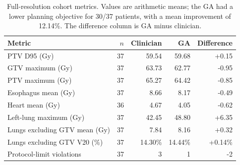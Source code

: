 \begin{table}[t]
\centering
\caption{Full-resolution cohort metrics. Values are arithmetic means; the GA had a lower planning objective for 30/37 patients, with a mean improvement of 12.14\%. The difference column is GA minus clinician.}
\label{tab:cohort-results}
\small
\begin{tabular}{lrrrr}
\toprule
Metric & $n$ & Clinician & GA & Difference \\
\midrule
PTV D95 (Gy) & 37 & 59.54 & 59.68 & +0.15 \\
GTV maximum (Gy) & 37 & 63.73 & 62.77 & -0.95 \\
PTV maximum (Gy) & 37 & 65.27 & 64.42 & -0.85 \\
Esophagus mean (Gy) & 37 & 8.66 & 8.17 & -0.49 \\
Heart mean (Gy) & 36 & 4.67 & 4.05 & -0.62 \\
Left-lung maximum (Gy) & 37 & 42.45 & 48.80 & +6.35 \\
Lungs excluding GTV mean (Gy) & 37 & 7.84 & 8.16 & +0.32 \\
Lungs excluding GTV V20 (\%) & 37 & 14.30\% & 14.44\% & +0.14\% \\
Protocol-limit violations & 37 & 3 & 1 & -2 \\
\bottomrule
\end{tabular}
\end{table}
